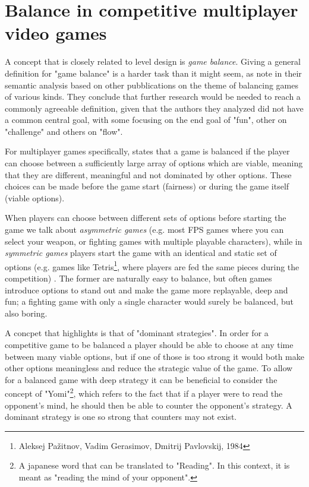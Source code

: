 \documentclass{Configuration_Files/PoliMi3i_thesis}
\begin{document}
\section{Balance in competitive multiplayer video games}
\label{sec:balance}
A concept that is closely related to level design is \textit{game balance}. Giving a general definition for "game balance" is a harder task than it might seem, as \citeauthor{becker_what_2020} note in their semantic analysis based on other pubblications on the theme of balancing games of various kinds. They conclude that further research would be needed to reach a commonly agreeable definition, given that the authors they analyzed did not have a common central goal, with some focusing on the end goal of "fun", other on "challenge" and others on "flow". \cite{becker_what_2020}

For multiplayer games specifically, \citeauthor{sirlin_balancing_2014} states that a game is balanced if the player can choose between a sufficiently large array of options which are viable, meaning that they are different, meaningful and not dominated by other options. These choices can be made before the game start (fairness) or during the game itself (viable options). \cite{sirlin_balancing_2014}

When players can choose between different sets of options before starting the game we talk about \textit{asymmetric games} (e.g. most FPS games where you can select your weapon, or fighting games with multiple playable characters), while in \textit{symmetric games} players start the game with an identical and static set of options (e.g. games like Tetris\footnote{Aleksej Pažitnov, Vadim Gerasimov, Dmitrij Pavlovskij, 1984}, where players are fed the same pieces during the competition) \cite{sirlin_balancing_2014}. The former are naturally easy to balance, but often games introduce options to stand out and make the game more replayable, deep and fun; a fighting game with only a single character would surely be balanced, but also boring. 

A concpet that \citeauthor{sirlin_balancing_2014} highlights is that of "dominant strategies". In order for a competitive game to be balanced a player should be able to choose at any time between many viable options, but if one of those is too strong it would both make other options meaningless and reduce the strategic value of the game. To allow for a balanced game with deep strategy it can be beneficial to consider the concept of "Yomi"\footnote{A japanese word that can be translated to "Reading". In this context, it is meant as "reading the mind of your opponent".}, which refers to the fact that if a player were to read the opponent's mind, he should then be able to counter the opponent's strategy. A dominant strategy is one so strong that counters may not exist. \cite{sirlin_balancing_2014}
\end{document}
